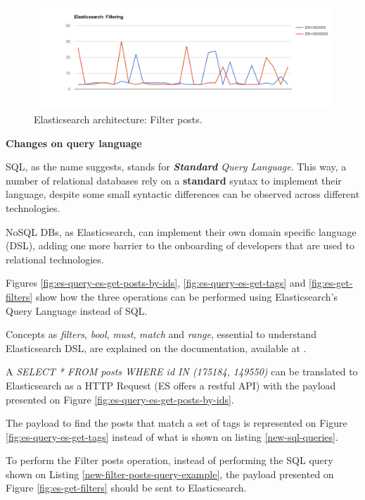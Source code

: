 \begin{figure}[ht!]
	\centering
	\includegraphics[width=150mm]{Imagens/es-filters.png}
	\caption{Elasticsearch architecture: Filter posts. \label{fig:es-filters}}
\end{figure}

\noindent \textbf{Changes on query language}

SQL, as the name suggests, stands for \textit{\textbf{Standard} Query Language}. This way, a number of relational databases rely on a \textbf{standard} syntax to implement their language, despite some small syntactic differences can be observed across different technologies.

NoSQL DBs, as Elasticsearch, can implement their own domain specific language (DSL), adding one more barrier to the onboarding of developers that are used to relational technologies. 

Figures \ref{fig:es-query-es-get-posts-by-ids}, \ref{fig:es-query-es-get-tags} and \ref{fig:es-get-filters} show how the three operations can be performed using Elasticsearch's Query Language instead of SQL.

Concepts as \textit{filters}, \textit{bool}, \textit{must}, \textit{match} and \textit{range}, essential to understand Elasticsearch DSL, are explained on the documentation, available at \cite{elasticfilters}.

A \textit{SELECT * FROM posts WHERE id IN (175184, 149550)} can be translated to Elasticsearch as a HTTP Request (ES offers a restful API) with the payload presented on Figure \ref{fig:es-query-es-get-posts-by-ids}. 

The payload to find the posts that match a set of tags is represented on Figure \ref{fig:es-query-es-get-tags} instead of what is shown on listing \ref{new-sql-queries}.

To perform the Filter posts operation, instead of performing the SQL query shown on Listing \ref{new-filter-posts-query-example}, the payload presented on Figure \ref{fig:es-get-filters} should be sent to Elasticsearch. 

